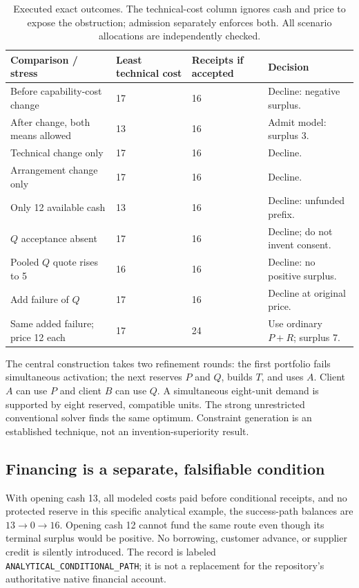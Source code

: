 \documentclass[11pt,a4paper]{article}
\begin{document}
\begin{table}[H]\small
\begin{tabularx}{\textwidth}{@{}YL{23mm}L{23mm}L{40mm}@{}}\toprule
\textbf{Comparison / stress} & \textbf{Least technical cost} & \textbf{Receipts if accepted} & \textbf{Decision}\\\midrule
Before capability-cost change & 17 & 16 & Decline: negative surplus.\\
After change, both means allowed & 13 & 16 & Admit model: surplus 3.\\
Technical change only & 17 & 16 & Decline.\\
Arrangement change only & 17 & 16 & Decline.\\
Only 12 available cash & 13 & 16 & Decline: unfunded prefix.\\
$Q$ acceptance absent & 17 & 16 & Decline; do not invent consent.\\
Pooled $Q$ quote rises to 5 & 16 & 16 & Decline: no positive surplus.\\
Add failure of $Q$ & 17 & 16 & Decline at original price.\\
Same added failure; price 12 each & 17 & 24 & Use ordinary $P+R$; surplus 7.\\\bottomrule
\end{tabularx}
\caption{Executed exact outcomes. The technical-cost column ignores cash and price to expose the obstruction; admission separately enforces both. All scenario allocations are independently checked.}
\end{table}

The central construction takes two refinement rounds: the first portfolio fails simultaneous activation; the next reserves $P$ and $Q$, builds $T$, and uses $A$. Client $A$ can use $P$ and client $B$ can use $Q$. A simultaneous eight-unit demand is supported by eight reserved, compatible units. The strong unrestricted conventional solver finds the same optimum. Constraint generation is an established technique, not an invention-superiority result.

\subsection{Financing is a separate, falsifiable condition}
With opening cash 13, all modeled costs paid before conditional receipts, and no protected reserve in this specific analytical example, the success-path balances are $13\rightarrow0\rightarrow16$. Opening cash 12 cannot fund the same route even though its terminal surplus would be positive. No borrowing, customer advance, or supplier credit is silently introduced. The record is labeled \texttt{ANALYTICAL\_CONDITIONAL\_PATH}; it is not a replacement for the repository's authoritative native financial account.
\end{document}

